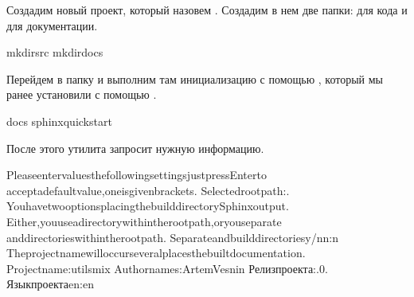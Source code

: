 \documentclass[letterpaper,10pt,russian]{sphinxmanual}
\begin{document}
\sphinxAtStartPar
Создадим новый проект, который назовем . Создадим в нем две папки:  для кода и  для документации.

\begin{sphinxVerbatim}[commandchars=\\\{\}]
mkdirsrc
mkdirdocs
\end{sphinxVerbatim}

\sphinxAtStartPar
Перейдем в папку  и выполним там инициализацию с помощью , который мы ранее установили с помощью .

\begin{sphinxVerbatim}[commandchars=\\\{\}]
docs
sphinx\PYGZhy{}quickstart
\end{sphinxVerbatim}

\sphinxAtStartPar
После этого утилита запросит нужную информацию.

\begin{sphinxVerbatim}[commandchars=\\\{\}]
PleaseentervaluesthefollowingsettingsjustpressEnterto
acceptadefaultvalue,oneisgivenbrackets.
Selectedrootpath:.
YouhavetwooptionsplacingthebuilddirectorySphinxoutput.
Either,youuseadirectorywithintherootpath,oryouseparate
anddirectorieswithintherootpath.
\PYGZgt{}Separateandbuilddirectoriesy/n\PYG{o}{[}n\PYG{o}{]}:n
Theprojectnamewilloccurseveralplacesthebuiltdocumentation.
\PYGZgt{}Projectname:utils\PYGZus{}mix
\PYGZgt{}Authornames:ArtemVesnin
\PYGZgt{}Релизпроекта\PYG{o}{[}\PYG{o}{]}:.0.
\PYGZgt{}Языкпроекта\PYG{o}{[}en\PYG{o}{]}:en
\end{sphinxVerbatim}
\end{document}
